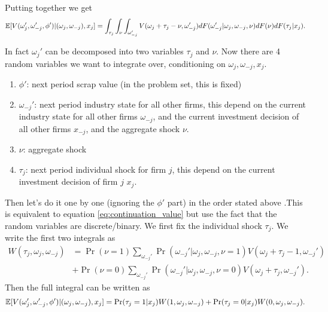 \documentclass[12pt]{article}[margin=1in]
\begin{document}
Putting together we get
\begin{equation}\label{eq:continuation_value}
    \mathbb{E}[V(\omega_j',\omega_{-j}',\phi')|(\omega_j, \omega_{-j}),x_j]=\int_{\tau_j} \int_\nu \int_{\omega_{-j}'} V(\omega_j+\tau_j-\nu, \omega_{-j}')dF(\omega_{-j}'|\omega_j,\omega_{-j},\nu)dF(\nu)dF(\tau_j|x_j).
\end{equation}

In fact $\omega_j'$ can be decomposed into two variables $\tau_j$ and $\nu$.  Now there are 4 random variables we want to integrate over, conditioning on $\omega_j, \omega_{-j}, x_j$.
\begin{enumerate}
    \item $\phi'$: next period scrap value (in the problem set, this is fixed)
    \item $\omega_{-j}'$: next period industry state for all other firms, this depend on the current industry state for all other firms $\omega_{-j}$, and the current investment decision of all other firms $x_{-j}$, and the aggregate shock $\nu$.
    \item $\nu$: aggregate shock
    \item $\tau_j$: next period individual shock for firm $j$, this depend on the current investment decision of firm $j$ $x_j$.
\end{enumerate}

Then let's do it one by one (ignoring the $\phi'$ part) in the order stated above .This is equivalent to equation \ref{eq:continuation_value} but use the fact that the random variables are discrete/binary.
We first fix the individual shock $\tau_j$. We write the first two integrals as
\begin{equation*}
    \begin{split}
        W(\tau_j,\omega_j,\omega_{-j}) & =\Pr(\nu=1)\sum_{\omega_{-j}'}\Pr(\omega_{-j}'|\omega_j,\omega_{-j},\nu=1)V(\omega_j+\tau_j-1, \omega_{-j}') \\
                                       & +\Pr(\nu=0)\sum_{\omega_{-j}'}\Pr(\omega_{-j}'|\omega_j,\omega_{-j},\nu=0)V(\omega_j+\tau_j, \omega_{-j}').
    \end{split}
\end{equation*}
Then the full integral can be written as
\begin{equation}\label{eq:continuation_value_m}
    \mathbb{E}[V(\omega_j',\omega_{-j}',\phi')|(\omega_j, \omega_{-j}),x_j]=\Pr(\tau_j=1|x_j)W(1, \omega_j,\omega_{-j})+ \Pr(\tau_j=0|x_j)W(0, \omega_j,\omega_{-j}).
\end{equation}
\end{document}

